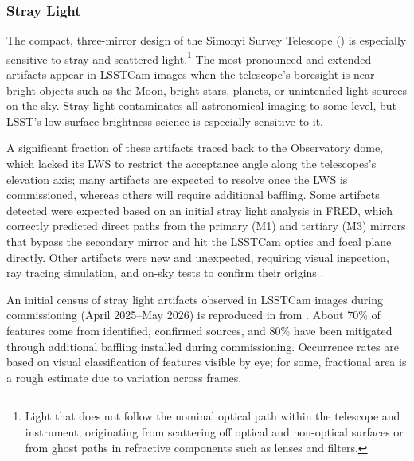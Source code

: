 \subsubsection{Stray Light}
\label{ssec:stray}
%
The compact, three-mirror design of the \gls{Simonyi Survey Telescope} () is especially sensitive to stray and scattered light.\footnote{Light that does not follow the nominal optical path within the telescope and instrument, originating from scattering off optical and non-optical surfaces or from ghost paths in refractive components such as lenses and filters.}
The most pronounced and extended artifacts appear in \gls{LSSTCam} images when the telescope's boresight is near bright objects such as the Moon, bright stars, planets, or unintended light sources on the sky.
Stray light contaminates all astronomical imaging to some level, but \gls{LSST}'s low-surface-brightness science is especially sensitive to it.

A significant fraction of these artifacts traced back to the Observatory dome, which lacked its \gls{LWS} to restrict the acceptance angle along the telescopes's elevation axis; many artifacts are expected to resolve once the \gls{LWS} is commissioned, whereas others will require additional baffling.
Some artifacts detected were expected based on an initial stray light analysis in FRED\registered \cite[][]{2009SPIE.7427E..08E}, which correctly predicted direct paths from the primary (M1) and tertiary (M3) mirrors that bypass the secondary mirror and hit the \gls{LSSTCam} optics and focal plane directly.
Other artifacts were new and unexpected, requiring visual inspection, ray tracing simulation, and on-sky tests to confirm their origins \citep[][]{2026arXiv2606.31945}.

An initial census of stray light artifacts observed in \gls{LSSTCam} images during commissioning (April 2025–May 2026) is reproduced in  from \cite[][]{2026arXiv2606.31945}.
About 70\% of features come from identified, confirmed sources, and 80\% have been mitigated through additional baffling installed during commissioning.
Occurrence rates are based on visual classification of features visible by eye; for some, fractional area is a rough estimate due to variation across frames.

